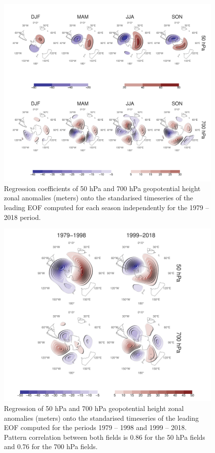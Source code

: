 \documentclass[]{ametsocV5}
\begin{document}
\begin{figure}
\includegraphics{A5-1} \caption[Regression coefficients of 50 hPa and 700 hPa geopotential height zonal anomalies (meters) onto the standarised timeseries of the leading EOF computed for each season independently for the 1979 -- 2018 period]{Regression coefficients of 50 hPa and 700 hPa geopotential height zonal anomalies (meters) onto the standarised timeseries of the leading EOF computed for each season independently for the 1979 -- 2018 period.}\label{fig:A5}
\end{figure}

\begin{figure}
\includegraphics{A6-1} \caption[Regression of 50 hPa and 700 hPa geopotential height zonal anomalies (meters) onto the standarised timeseries of the leading EOF computed for the periods 1979 -- 1998 and 1999 -- 2018]{Regression of 50 hPa and 700 hPa geopotential height zonal anomalies (meters) onto the standarised timeseries of the leading EOF computed for the periods 1979 -- 1998 and 1999 -- 2018. Pattern correlation between both fields is 0.86 for the 50 hPa fields and 0.76 for the 700 hPa fields.}\label{fig:A6}
\end{figure}
\end{document}
